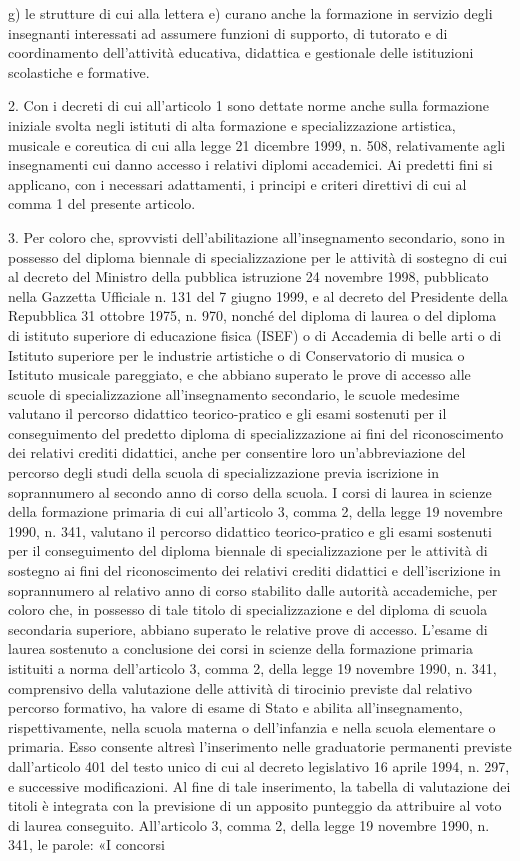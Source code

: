 g) le strutture di cui alla lettera e) curano anche la formazione in servizio degli insegnanti interessati ad assumere funzioni di supporto, di tutorato e di coordinamento dell'attività educativa, didattica e gestionale delle istituzioni scolastiche e formative.

2. Con i decreti di cui all'articolo 1 sono dettate norme anche sulla formazione iniziale svolta negli istituti di alta formazione e specializzazione artistica, musicale e coreutica di cui alla legge 21 dicembre 1999, n. 508, relativamente agli insegnamenti cui danno accesso i relativi diplomi accademici. Ai predetti fini si applicano, con i necessari adattamenti, i principi e criteri direttivi di cui al comma 1 del presente articolo.

3. Per coloro che, sprovvisti dell'abilitazione all'insegnamento secondario, sono in possesso del diploma biennale di specializzazione per le attività di sostegno di cui al decreto del Ministro della pubblica istruzione 24 novembre 1998, pubblicato nella Gazzetta Ufficiale n. 131 del 7 giugno 1999, e al decreto del Presidente della Repubblica 31 ottobre 1975, n. 970, nonché del diploma di laurea o del diploma di istituto superiore di educazione fisica (ISEF) o di Accademia di belle arti o di Istituto superiore per le industrie artistiche o di Conservatorio di musica o Istituto musicale pareggiato, e che abbiano superato le prove di accesso alle scuole di specializzazione all'insegnamento secondario, le scuole medesime valutano il percorso didattico teorico-pratico e gli esami sostenuti per il conseguimento del predetto diploma di specializzazione ai fini del riconoscimento dei relativi crediti didattici, anche per consentire loro un'abbreviazione del percorso degli studi della scuola di specializzazione previa iscrizione in soprannumero al secondo anno di corso della scuola. I corsi di laurea in scienze della formazione primaria di cui all'articolo 3, comma 2, della legge 19 novembre 1990, n. 341, valutano il percorso didattico teorico-pratico e gli esami sostenuti per il conseguimento del diploma biennale di specializzazione per le attività di sostegno ai fini del riconoscimento dei relativi crediti didattici e dell'iscrizione in soprannumero al relativo anno di corso stabilito dalle autorità accademiche, per coloro che, in possesso di tale titolo di specializzazione e del diploma di scuola secondaria superiore, abbiano superato le relative prove di accesso. L'esame di laurea sostenuto a conclusione dei corsi in scienze della formazione primaria istituiti a norma dell'articolo 3, comma 2, della legge 19 novembre 1990, n. 341, comprensivo della valutazione delle attività di tirocinio previste dal relativo percorso formativo, ha valore di esame di Stato e abilita all'insegnamento, rispettivamente, nella scuola materna o dell'infanzia e nella scuola elementare o primaria. Esso consente altresì l'inserimento nelle graduatorie permanenti previste dall'articolo 401 del testo unico di cui al decreto legislativo 16 aprile 1994, n. 297, e successive modificazioni. Al fine di tale inserimento, la tabella di valutazione dei titoli è integrata con la previsione di un apposito punteggio da attribuire al voto di laurea conseguito. All'articolo 3, comma 2, della legge 19 novembre 1990, n. 341, le parole: «I concorsi 